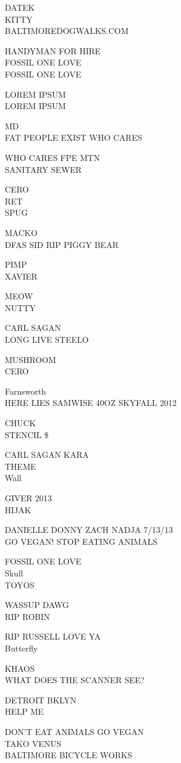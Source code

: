 \documentclass[10pt,letterpaper]{article}
\begin{document}
DATEK\\
KITTY\\
BALTIMOREDOGWALKS.COM

HANDYMAN FOR HIRE\\
FOSSIL ONE LOVE\\
FOSSIL ONE LOVE

LOREM IPSUM\\
LOREM IPSUM

MD\\
FAT PEOPLE EXIST WHO CARES

WHO CARES FPE MTN\\
SANITARY SEWER

CERO\\
RET\\
SPUG

MACKO\\
DFAS SID RIP PIGGY BEAR

PIMP\\
XAVIER

MEOW\\
NUTTY

CARL SAGAN\\
LONG LIVE STEELO

MUSHROOM\\
CERO

Farnsworth\\
HERE LIES SAMWISE 40OZ SKYFALL 2012

CHUCK\\
STENCIL \$

CARL SAGAN KARA\\
THEME\\
Wall

GIVER 2013\\
HIJAK

DANIELLE DONNY ZACH NADJA 7/13/13\\
GO VEGAN! STOP EATING ANIMALS

FOSSIL ONE LOVE\\
Skull\\
TOYOS

WASSUP DAWG\\
RIP ROBIN

RIP RUSSELL LOVE YA\\
Butterfly

KHAOS\\
WHAT DOES THE SCANNER SEE?

DETROIT BKLYN\\
HELP ME

DON'T EAT ANIMALS GO VEGAN\\
TAKO VENUS\\
BALTIMORE BICYCLE WORKS
\end{document}
